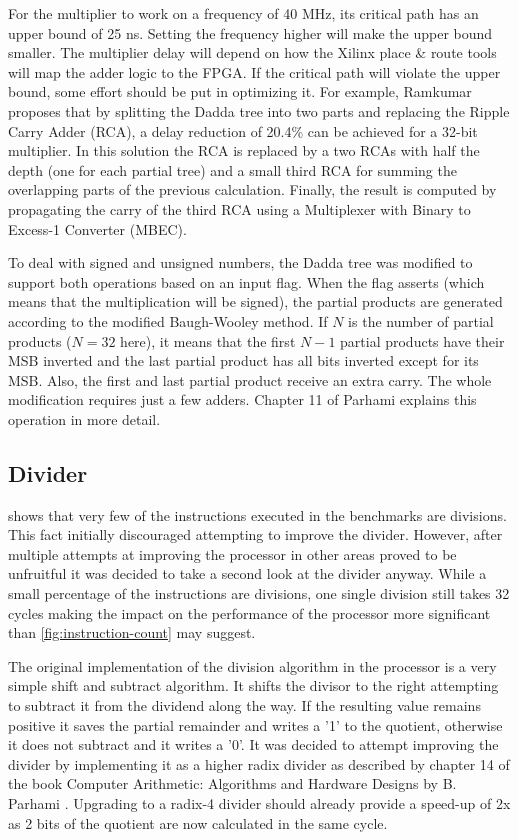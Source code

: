 \documentclass[final]{article}
\begin{document}
For the multiplier to work on a frequency of 40 MHz, its critical path has an upper bound of 25 ns. Setting the frequency higher will make the upper bound smaller. The multiplier delay will depend on how the Xilinx place \& route tools will map the adder logic to the FPGA. If the critical path will violate the upper bound, some effort should be put in optimizing it. For example, Ramkumar \cite{ramkumar} proposes that by splitting the Dadda tree into two parts and replacing the Ripple Carry Adder (RCA), a delay reduction of 20.4\% can be achieved for a 32-bit multiplier. In this solution the RCA is replaced by a two RCAs with half the depth (one for each partial tree) and a small third RCA for summing the overlapping parts of the previous calculation. Finally, the result is computed by propagating the carry of the third RCA using a Multiplexer with Binary to Excess-1 Converter (MBEC).

To deal with signed and unsigned numbers, the Dadda tree was modified to support both operations based on an input flag. When the flag asserts (which means that the multiplication will be signed), the partial products are generated according to the modified Baugh-Wooley method. If $N$ is the number of partial products ($N=32$ here), it means that the first $N-1$ partial products have their MSB inverted and the last partial product has all bits inverted except for its MSB. Also, the first and last partial product receive an extra carry. The whole modification requires just a few adders. Chapter 11 of Parhami \cite{parhami} explains this operation in more detail.

\subsection{Divider}
 shows that very few of the instructions executed in the benchmarks are divisions. This fact initially discouraged attempting to improve the divider. However, after multiple attempts at improving the processor in other areas proved to be unfruitful it was decided to take a second look at the divider anyway. While a small percentage of the instructions are divisions, one single division still takes 32 cycles making the impact on the performance of the processor more significant than \cref{fig:instruction-count} may suggest. 

The original implementation of the division algorithm in the processor is a very simple shift and subtract algorithm. It shifts the divisor to the right attempting to subtract it from the dividend along the way. If the resulting value remains positive it saves the partial remainder and writes a '1' to the quotient, otherwise it does not subtract and it writes a '0'. It was decided to attempt improving the divider by implementing it as a higher radix divider as described by chapter 14 of the book Computer Arithmetic: Algorithms and Hardware Designs by B. Parhami \cite{parhami}. Upgrading to a radix-4 divider should already provide a speed-up of 2x as 2 bits of the quotient are now calculated in the same cycle.
\end{document}
